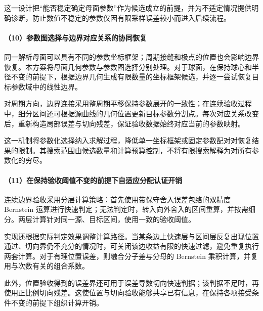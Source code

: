 这一设计把“能否稳定确定母面参数”作为候选成立的前提，并为不适定情况提供明确诊断，防止数值不稳定的参数仅因有限采样误差较小而进入后续流程。

\paragraph{（10）参数图选择与边界对应关系的协同恢复}
同一解析母面可以具有不同的参数坐标框架；周期接缝和极点的位置也会影响边界恢复。本方案将母面几何参数与参数图选择分别处理。对于球面，在保持球心和半径不变的前提下，根据边界几何生成有限数量的坐标框架候选，并逐一尝试恢复目标参数域中的线性边界。

对周期方向，边界连接采用整周期平移保持参数展开的一致性；在连续验收过程中，细分区间还可根据源曲线的几何位置更新目标参数分割点。每次对应关系改变后，重新构造局部误差与切向残差，保证验收数据始终对应当前的参数映射。

这一机制将参数化选择纳入求解过程，降低单一坐标框架或固定参数配对对恢复结果的限制。其搜索范围由候选数量和计算预算控制，不将有限搜索解释为对所有参数化的穷尽。

\paragraph{（11）在保持验收阈值不变的前提下自适应分配认证开销}
连续边界验收采用分层计算策略：首先使用带保守舍入误差包络的双精度 Bernstein 运算进行快速判定；无法判定时，转入向外舍入的区间重算，并按需细分。两层计算针对同一源、目标区间，使用一致的验收阈值。

实现还根据实际判定效果调整计算路径。当某条边上快速层与区间层反复出现位置通过、切向界仍不充分的情况时，可关闭该边收益有限的快速过滤，避免重复执行两套计算。对于有理位置误差，则融合分子差与分母的 Bernstein 乘积计算，并复用与次数有关的组合系数。

此外，位置验收得到的误差界还可用于误差导数切向快速判据；该判据不足时，再使用正比例切向残差。这使位置与切向验收能够共享已有信息，在保持各项接受条件不变的前提下组织计算开销。

